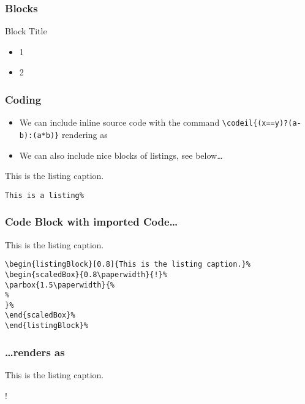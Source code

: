 \documentclass[mathserif]{beamer}%
\begin{document}
%
\begin{frame}%
\frametitle{Blocks}%
\begin{block}{Block Title}%
\begin{itemize}%
\item 1%
\item 2%
\end{itemize}%
\end{block}%
\end{frame}%
%
\begin{frame}[containsverbatim]%
\frametitle{Coding}%
\begin{itemize}%
\item We can include inline source code with the command \texttt{{\textbackslash}codeil\{(x==y)?(a-b):(a*b)\}} rendering as %
\item We can also include nice blocks of listings, see below\dots%
\end{itemize}%
\begin{center}%
\begin{listingBlock}[0.8]{This is the listing caption.}%
\begin{lstlisting}
This is a listing%
\end{lstlisting}%
\end{listingBlock}%
\end{center}%
\end{frame}%
%
%
\begin{frame}[containsverbatim]%
\frametitle{Code Block with imported Code\dots}%
\begin{center}%
\begin{listingBlock}[0.9]{This is the listing caption.}%
\begin{lstlisting}
\begin{listingBlock}[0.8]{This is the listing caption.}%
\begin{scaledBox}{0.8\paperwidth}{!}%
\parbox{1.5\paperwidth}{%
%
}%
\end{scaledBox}%
\end{listingBlock}%
\end{lstlisting}%
\end{listingBlock}%
\end{center}%
\end{frame}%
%
\begin{frame}[containsverbatim]%
\frametitle{{\dots}renders as}%
\begin{center}%
\begin{listingBlock}[0.8]{This is the listing caption.}%
\begin{scaledBox}{0.8\paperwidth}{!}%
\parbox{1.5\paperwidth}{%
%
}%
\end{scaledBox}%
\end{listingBlock}%
\end{center}%
\end{frame}%
%
%
\endPresentation%
%
\end{document}
